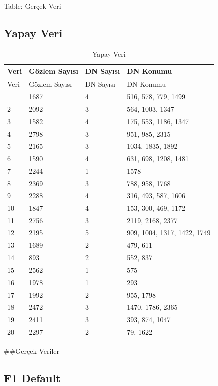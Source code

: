 \documentclass[12pt,twoside]{deuthesis}
\begin{document}
Table: \label{tab:nvar1} Gerçek Veri

\hypertarget{yapay-veri}{%
\subsection{Yapay Veri}\label{yapay-veri}}

\begin{longtable}[]{@{}llll@{}}
\caption{\label{tab:nvar2} Yapay Veri}\tabularnewline
\toprule\noalign{}
Veri & Gözlem Sayısı & DN Sayısı & DN Konumu \\
\midrule\noalign{}
\endfirsthead
\toprule\noalign{}
Veri & Gözlem Sayısı & DN Sayısı & DN Konumu \\
\midrule\noalign{}
\endhead
\bottomrule\noalign{}
\endlastfoot
1 & 1687 & 4 & 516, 578, 779, 1499 \\
2 & 2092 & 3 & 564, 1003, 1347 \\
3 & 1582 & 4 & 175, 553, 1186, 1347 \\
4 & 2798 & 3 & 951, 985, 2315 \\
5 & 2165 & 3 & 1034, 1835, 1892 \\
6 & 1590 & 4 & 631, 698, 1208, 1481 \\
7 & 2244 & 1 & 1578 \\
8 & 2369 & 3 & 788, 958, 1768 \\
9 & 2288 & 4 & 316, 493, 587, 1606 \\
10 & 1847 & 4 & 153, 300, 469, 1172 \\
11 & 2756 & 3 & 2119, 2168, 2377 \\
12 & 2195 & 5 & 909, 1004, 1317, 1422, 1749 \\
13 & 1689 & 2 & 479, 611 \\
14 & 893 & 2 & 552, 837 \\
15 & 2562 & 1 & 575 \\
16 & 1978 & 1 & 293 \\
17 & 1992 & 2 & 955, 1798 \\
18 & 2472 & 3 & 1470, 1786, 2365 \\
19 & 2411 & 3 & 393, 874, 1047 \\
20 & 2297 & 2 & 79, 1622 \\
\end{longtable}

\#\#Gerçek Veriler

\hypertarget{f1-default}{%
\subsection{F1 Default}\label{f1-default}}
\end{document}

